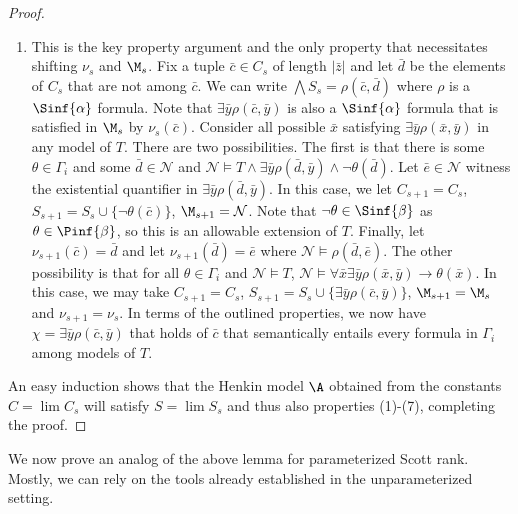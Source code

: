 \documentclass[10pt,a4paper]{amsart}
\renewcommand{\-}{\text{-}}
\begin{document}
\begin{proof}
\begin{enumerate}[align=left,leftmargin=\parindent]
			Given $\varphi_i$ and $\bar{c}\in C_s$ of the appropriate length $S_{s+1}=S_s\cup\{\varphi_i(\bar{c})\}$, $\M_{s+1}=\M_s$, $C_{s+1}=C_s$ and $\nu_{s+1}=\nu_s$.
			\item[Property $(7)$]
			This is the key property argument and the only property that necessitates shifting $\nu_s$ and $\M_s$.
			Fix a tuple  $\bar{c}\in C_s$ of length $\vert \bar{z} \vert$ and let $\bar{d}$ be the elements of $C_s$ that are not among $\bar{c}$.
			We can write $\bigwedge S_s=\rho(\bar{c},\bar{d})$ where $\rho$ is a $\Sinf{\alpha}$ formula.
			Note that $\exists\bar{y}\rho(\bar{c},\bar{y})$ is also a $\Sinf{\alpha}$ formula that is satisfied in $\M_s$ by $\nu_s(\bar{c})$.
			Consider all possible $\bar{x}$ satisfying $\exists\bar{y}\rho(\bar{x},\bar{y})$ in any model of $T$.
			There are two possibilities.
			The first is that there is some $\theta\in\Gamma_i$ and some $\bar{d}\in \mathcal{N}$ and $\mathcal{N}\models T \land \exists\bar{y}\rho(\bar{d},\bar{y})\land \lnot \theta(\bar{d})$.
			Let $\bar e\in \mathcal{N}$ witness the existential quantifier in $\exists\bar{y}\rho(\bar{d},\bar{y})$.
			In this case, we let $C_{s+1}=C_s$, $S_{s+1}=S_s\cup\{\lnot\theta(\bar{c})\}$, $\M_{s+1}=\mathcal{N}$.
			Note that $\lnot\theta\in \Sinf{\beta}$ as $\theta\in \Pinf{\beta}$, so this is an allowable extension of $T$.
			Finally, let $\nu_{s+1}(\bar{c})=\bar{d}$ and let $\nu_{s+1}(\bar{d})=\bar{e}$ where $\mathcal{N}\models \rho(\bar{d},\bar{e})$.
			The other possibility is that for all $\theta\in\Gamma_i$ and $\mathcal{N}\models T$, $\mathcal{N}\models \forall \bar x\exists\bar{y}\rho(\bar{x},\bar{y})\to\theta(\bar{x})$.
			In this case, we may take $C_{s+1}=C_s$, $S_{s+1}=S_s\cup\{\exists\bar{y}\rho(\bar{c},\bar{y})\}$, $\M_{s+1}=\M_s$ and $\nu_{s+1}=\nu_s$.
			In terms of the outlined properties, we now have $\chi=\exists\bar{y}\rho(\bar{c},\bar{y})$ that holds of $\bar{c}$ that semantically entails every formula in $\Gamma_i$ among models of $T$.
		\end{enumerate}
		
		An easy induction shows that the Henkin model $\A$ obtained from the constants $C=\lim C_s$ will satisfy $S=\lim S_s$ and thus also properties (1)-(7), completing the proof.

\end{proof}

We now prove an analog of the above lemma for parameterized Scott rank.
Mostly, we can rely on the tools already established in the unparameterized setting.
\end{document}
